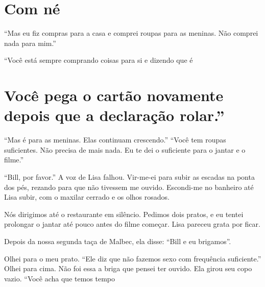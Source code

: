 \section{Com né}
 \par 
“Mas eu fiz compras para a casa e comprei roupas para as meninas. Não comprei nada para mim.”
 \par 
“Você está sempre comprando coisas para si e dizendo que é
 \par 
\section{Você pega o cartão novamente depois que a declaração rolar.”}
 \par 
“Mas é para as meninas. Elas continuam crescendo.” “Você tem roupas suficientes. Não precisa de mais nada. Eu te dei o suficiente para o jantar e o filme.”
 \par 
“Bill, por favor.” A voz de Lisa falhou. Vir-me-ei para subir as escadas na ponta dos pés, rezando para que não tivessem me ouvido. Escondi-me no banheiro até Lisa subir, com o maxilar cerrado e os olhos rosados.
 \par 
Nós dirigimos até o restaurante em silêncio. Pedimos dois pratos, e eu tentei prolongar o jantar até pouco antes do filme começar. Lisa pareceu grata por ficar.
 \par 
Depois da nossa segunda taça de Malbec, ela disse: “Bill e eu brigamos”.
 \par 
Olhei para o meu prato. “Ele diz que não fazemos sexo com frequência suficiente.” Olhei para cima. Não foi essa a briga que pensei ter ouvido. Ela girou seu copo vazio. “Você acha que temos tempo
 \par 
